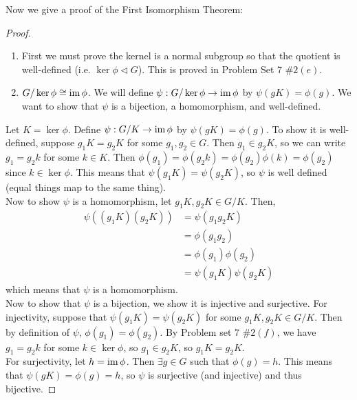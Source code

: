 Now we give a proof of the First Isomorphism Theorem:

\begin{proof}
\begin{enumerate}
    \item First we must prove the kernel is a normal subgroup so that the quotient is well-defined (i.e. $\ker \phi \triangleleft G$). This is proved in Problem Set 7 $\# 2(e)$.
    \item $G /\ker \phi \cong \operatorname{im} \phi$. We will define $\psi : G /\ker \phi \to \operatorname{im} \phi$ by $\psi (gK) = \phi(g)$. We want to show that $\psi$ is a bijection, a homomorphism, and well-defined.
\end{enumerate}

Let $K = \ker \phi$. Define $\psi : G/K \to \operatorname{im} \phi$ by $\psi(gK) = \phi(g)$. To show it is well-defined, suppose $g_1K = g_2K$ for some $g_1, g_2 \in G$. Then $g_1 \in g_2K$, so we can write $g_1 = g_2k$ for some $k \in K$. Then $\phi(g_1) = \phi(g_2k) = \phi(g_2)\phi(k) = \phi(g_2)$ since $k \in \ker\phi$. This means that $\psi(g_1K) = \psi(g_2K)$, so $\psi$ is well defined (equal things map to the same thing). \\

Now to show $\psi$ is a homomorphism, let $g_1K, g_2K \in G/K$. Then,
\begin{align*}
    \psi((g_1K)(g_2K)) &= \psi(g_1g_2K) \\
    &= \phi(g_1g_2) \\
    &= \phi(g_1)\phi(g_2) \\
    &= \psi(g_1K)\psi(g_2K)
\end{align*}
which means that $\psi$ is a homomorphism.\\

Now to show that $\psi$ is a bijection, we show it is injective and surjective. For injectivity, suppose that $\psi (g_1K) = \psi(g_2K)$ for some $g_1K, g_2K \in G/K$. Then by definition of $\psi$, $\phi(g_1) = \phi(g_2)$. By Problem set $7$ $\# 2(f)$, we have $g_1 = g_2k$ for some $k \in \ker \phi$, so $g_1 \in g_2K$, so $g_1K = g_2K$.\\

For surjectivity, let $h = \operatorname{im} \phi$. Then $\exists g \in G$ such that $\phi(g) = h$. This means that $\psi(gK) = \phi(g) = h$, so $\psi$ is surjective (and injective) and thus bijective.
\end{proof}